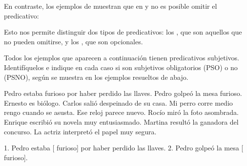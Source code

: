 En contraste, los ejemplos de  muestran que en
 y  no es posible omitir el predicativo:

\begin{exe}
  \ex\label{ex:09-obligatorios}
    \begin{xlist}
    \end{xlist}
\end{exe}

Esto nos permite distinguir dos tipos de predicativos: los , que son aquellos que no pueden omitirse, y los
, que son opcionales.

\begin{ejercicio}\label{ej:09-pso-psno}
Todos los ejemplos que aparecen a continuación tienen predicativos subjetivos.
Identifíquelos e indique en cada caso si son subjetivos obligatorios (PSO) o no
(PSNO), según se muestra en los ejemplos resueltos de abajo.

\begin{exe}
  \ex Pedro estaba furioso por haber perdido las llaves.
  \ex Pedro golpeó la mesa furioso.
  \ex Ernesto es biólogo.
  \ex Carlos salió despeinado de su casa.
  \ex Mi perro corre medio rengo cuando se asusta.
  \ex Ese reloj parece nuevo.
  \ex Rocío miró la foto asombrada.
  \ex Enrique escribió su novela muy entusiasmado.
  \ex Martina resultó la ganadora del concurso.
  \ex La actriz interpretó el papel muy segura.
\end{exe}

\begin{resuelto}
1. Pedro estaba [ furioso] por haber perdido las llaves. 2. Pedro
golpeó la mesa [ furioso].
\end{resuelto}
\end{ejercicio}

